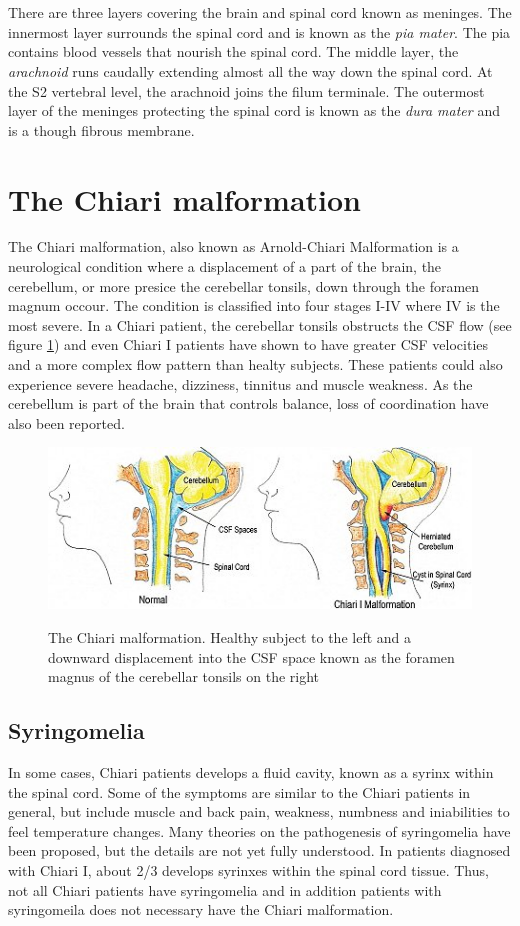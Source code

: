 \\
\\
There are three layers covering the brain and spinal cord known as meninges. The innermost layer surrounds the spinal cord and is known as the \textit{pia mater}. The pia contains blood vessels that nourish the spinal cord. The middle layer, the \textit{arachnoid} runs caudally extending almost all the way down the spinal cord. At the S2 vertebral level, the arachnoid joins the filum terminale. The outermost layer of the meninges protecting the spinal cord is known as the \textit{dura mater} and is a though fibrous membrane. 
\\
\section{The Chiari malformation}
The Chiari malformation, also known as Arnold-Chiari Malformation is a neurological condition where a displacement of a part of the brain, the cerebellum, or more presice the cerebellar tonsils, down through the foramen magnum occour. The condition is classified into four stages I-IV where IV is the most severe. In a Chiari patient, the cerebellar tonsils obstructs the CSF flow (see figure \ref{fig:CSF}) and even Chiari I patients have shown to have greater CSF velocities and a more complex flow pattern than healty subjects. \cite{Quig04} These patients could also experience severe headache, dizziness, tinnitus and muscle weakness. As the cerebellum is part of the brain that controls balance, loss of coordination have also been reported. 
\begin{figure}[!ht]
\includegraphics[scale=0.8]{figures/Ida_CSF.png} \\
\caption{The Chiari malformation. Healthy subject to the left and a downward displacement into the CSF space known as the foramen magnus of the cerebellar tonsils on the right} \label{fig:CSF}
\end{figure}
\subsection{Syringomelia}
In some cases, Chiari patients develops a fluid cavity, known as a syrinx within the spinal cord. Some of the symptoms are similar to the Chiari patients in general, but include muscle and back pain, weakness, numbness and iniabilities to feel temperature changes. Many theories on the pathogenesis of syringomelia have been proposed, but the details are not yet fully understood. In patients diagnosed with Chiari I, about 2/3 develops syrinxes within the spinal cord tissue. Thus, not all Chiari patients have syringomelia and in addition patients with syringomeila does not necessary have the Chiari malformation.  \\

